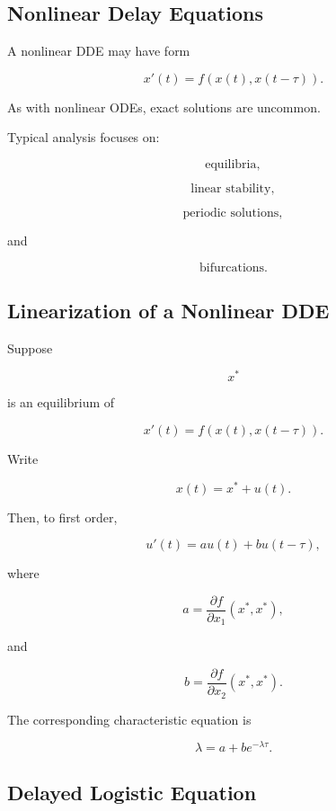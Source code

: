 \subsection{Nonlinear Delay Equations}
\label{subsec:nonlinear-delay-equations}

A nonlinear DDE may have form

\[
\boxed{
x'(t)
=
f
\left(
x(t),
x(t-\tau)
\right).
}
\]

As with nonlinear ODEs, exact solutions are uncommon.

Typical analysis focuses on:

\[
\boxed{
\text{equilibria},
}
\]

\[
\boxed{
\text{linear stability},
}
\]

\[
\boxed{
\text{periodic solutions},
}
\]

and

\[
\boxed{
\text{bifurcations}.
}
\]

\subsection{Linearization of a Nonlinear DDE}
\label{subsec:linearization-nonlinear-dde}

Suppose

\[
x^*
\]

is an equilibrium of

\[
x'(t)
=
f
\left(
x(t),
x(t-\tau)
\right).
\]

Write

\[
x(t)=x^*+u(t).
\]

Then, to first order,

\[
\boxed{
u'(t)
=
a u(t)
+
b u(t-\tau),
}
\]

where

\[
\boxed{
a
=
\frac{\partial f}{\partial x_1}
(x^*,x^*),
}
\]

and

\[
\boxed{
b
=
\frac{\partial f}{\partial x_2}
(x^*,x^*).
}
\]

The corresponding characteristic equation is

\[
\boxed{
\lambda
=
a
+
be^{-\lambda\tau}.
}
\]

\subsection{Delayed Logistic Equation}
\label{subsec:delayed-logistic-equation}

